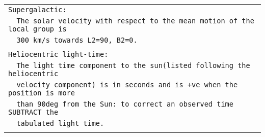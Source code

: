 \begin{tiny}
\begin{center}
\begin{tabular}{|l|}
\\
\verb|Supergalactic:|\\
\verb|  The solar velocity with respect to the mean motion of the local group is|\\
\verb|  300 km/s towards L2=90, B2=0.|\\
\\
\verb|Heliocentric light-time:|\\
\verb|  The light time component to the sun(listed following the heliocentric|\\
\verb|  velocity component) is in seconds and is +ve when the position is more|\\
\verb|  than 90deg from the Sun: to correct an observed time SUBTRACT the|\\
\verb|  tabulated light time.|\\
\\
\hline
\end{tabular}


\end{center}
\end{tiny}
